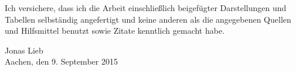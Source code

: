 
Ich versichere, dass ich die Arbeit einschließlich beigefügter Darstellungen und Tabellen selbständig angefertigt und keine anderen als die angegebenen Quellen und Hilfsmittel benutzt sowie Zitate kenntlich gemacht habe. 

\vspace{3cm}

Jonas Lieb \\
Aachen, den 9. September 2015